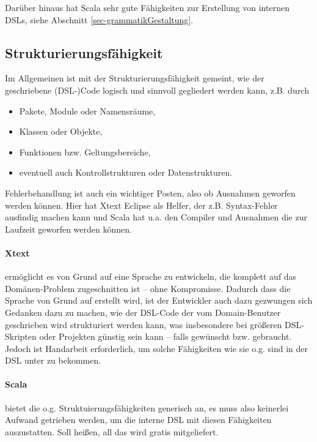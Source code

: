 Darüber hinaus hat Scala sehr gute Fähigkeiten zur Erstellung von internen
DSLs, siehe Abschnitt \ref{sec-grammatikGestaltung}.


\subsection{Strukturierungsfähigkeit}\label{sec-strukturierungsfaehigkeit}

Im Allgemeinen ist mit der Strukturierungsfähigkeit gemeint, wie der
geschriebene (DSL-)Code logisch und sinnvoll gegliedert werden kann,
z.B. durch

\begin{itemize}
  \item Pakete, Module oder Namensräume,
  \item Klassen oder Objekte,
  \item Funktionen bzw. Geltungsbereiche,
  \item eventuell auch Kontrollstrukturen oder Datenstrukturen.
\end{itemize}

Fehlerbehandlung ist auch ein wichtiger Posten, also ob Ausnahmen
geworfen werden können. Hier hat Xtext Eclipse als Helfer, der
z.B. Syntax-Fehler ausfindig machen kann und Scala hat u.a. den Compiler
und Ausnahmen die zur Laufzeit geworfen werden können.

\paragraph{Xtext} ermöglicht es von Grund auf eine Sprache zu entwickeln,
die komplett auf das Domänen-Problem zugeschnitten ist -- ohne Kompromisse.
Dadurch dass die Sprache von Grund auf erstellt wird, ist der Entwickler
auch dazu gezwungen sich Gedanken dazu zu machen, wie der DSL-Code
der vom Domain-Benutzer geschrieben wird strukturiert werden kann,
was insbesondere bei größeren DSL-Skripten oder
Projekten günstig sein kann -- falls gewünscht bzw. gebraucht.
Jedoch ist Handarbeit erforderlich, um solche Fähigkeiten wie sie o.g.
sind in der DSL unter zu bekommen.

\paragraph{Scala} bietet die o.g. Struktuierungsfähigkeiten generisch an,
es muss also keinerlei Aufwand getrieben werden, um die interne DSL mit
diesen Fähigkeiten auszustatten. Soll heißen, all das wird gratis mitgeliefert.


